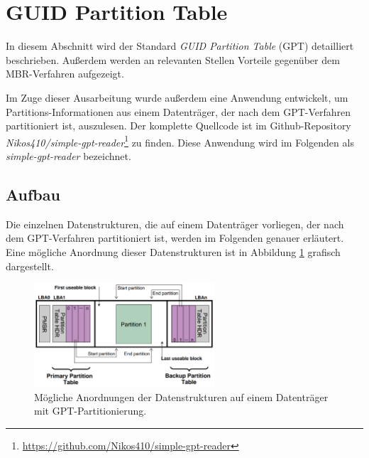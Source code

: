 \section{GUID Partition Table}
\label{sec:gpt}
In diesem Abschnitt wird der Standard \textit{GUID Partition Table} (GPT) detailliert beschrieben.
Außerdem werden an relevanten Stellen Vorteile gegenüber dem MBR-Verfahren aufgezeigt.

Im Zuge dieser Ausarbeitung wurde außerdem eine Anwendung entwickelt, um Partitions-Informationen aus einem Datenträger, der nach dem GPT-Verfahren partitioniert ist, auszulesen.
Der komplette Quellcode ist im Github-Repository \textit{Nikos410/simple-gpt-reader}\footnote{\url{https://github.com/Nikos410/simple-gpt-reader}} zu finden.
Diese Anwendung wird im Folgenden als \textit{simple-gpt-reader} bezeichnet.


\subsection{Aufbau}
\label{sec:gpt:structure}

Die einzelnen Datenstrukturen, die auf einem Datenträger vorliegen, der nach dem GPT-Verfahren partitioniert ist, werden im Folgenden genauer erläutert.
Eine mögliche Anordnung dieser Datenstrukturen ist in Abbildung \ref{fig:gpt_layout} grafisch dargestellt.

\begin{figure}[ht]
    \begin{center}
        \includegraphics[width=0.6\textwidth]{content/graphics/GPT_Layout.png}
    \end{center}

    \vspace{-0.5cm}

    \caption{Mögliche Anordnungen der Datenstrukturen auf einem Datenträger mit GPT-Partitionierung. \cite{uefi-spec}}
    \label{fig:gpt_layout}
\end{figure}
\vspace{-0.5cm}

